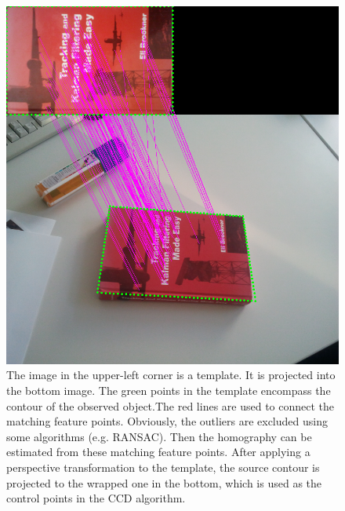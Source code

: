 \begin{figure}[htbp]
  \centering
\includegraphics[width=\linewidth]{images/sift.png}
\caption[Contour initialization using the SIFT algorithm]{The image in
  the upper-left corner is a template. It is projected into the bottom
  image. The green points in the template encompass the
  contour of the observed object.The red lines are used to connect the matching feature
  points. Obviously, the outliers are excluded using some algorithms
  (e.g. RANSAC). Then the homography can be estimated from these matching
  feature points.  After applying a perspective
  transformation to the template, the source contour is projected to
  the wrapped one in the bottom, which is used as the control points
  in the CCD algorithm.
  }
\label{fig:sift}
\end{figure}

